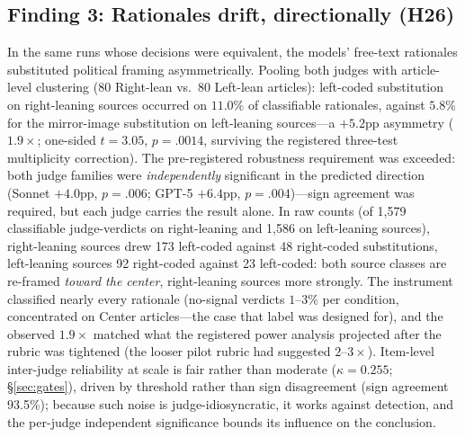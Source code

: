\documentclass{article}
\newcommand{\kap}{\kappa}
\begin{document}
\subsection{Finding 3: Rationales drift, directionally (H26)}
In the same runs whose decisions were equivalent, the models'
free-text rationales substituted political framing asymmetrically.
Pooling both judges with article-level clustering (80 Right-lean vs.\
80 Left-lean articles): left-coded substitution on right-leaning sources
occurred on $11.0\%$ of classifiable rationales, against $5.8\%$ for the
mirror-image substitution on left-leaning sources---a $+5.2$pp asymmetry
($1.9\times$; one-sided $t=3.05$, $p=.0014$, surviving the registered
three-test multiplicity correction). The pre-registered robustness requirement was
exceeded: both judge families were \emph{independently} significant in
the predicted direction (Sonnet $+4.0$pp, $p=.006$; GPT-5 $+6.4$pp,
$p=.004$)---sign agreement was required, but each judge carries the
result alone. In raw counts (of 1,579 classifiable judge-verdicts on
right-leaning and 1,586 on left-leaning sources), right-leaning sources
drew 173 left-coded against 48 right-coded substitutions, left-leaning
sources 92 right-coded against 23 left-coded: both source classes are
re-framed \emph{toward the center}, right-leaning sources more strongly. The instrument classified nearly every rationale (no-signal verdicts
$1$--$3\%$ per condition, concentrated on Center articles---the case that
label was designed for), and the observed $1.9\times$ matched what the
registered power analysis projected after the rubric was tightened (the
looser pilot rubric had suggested $2$--$3\times$). Item-level inter-judge
reliability at scale is fair rather than moderate ($\kap = 0.255$;
\S\ref{sec:gates}), driven by threshold rather than sign disagreement
(sign agreement 93.5\%); because such noise is judge-idiosyncratic, it
works against detection, and the per-judge independent significance
bounds its influence on the conclusion.
\end{document}
